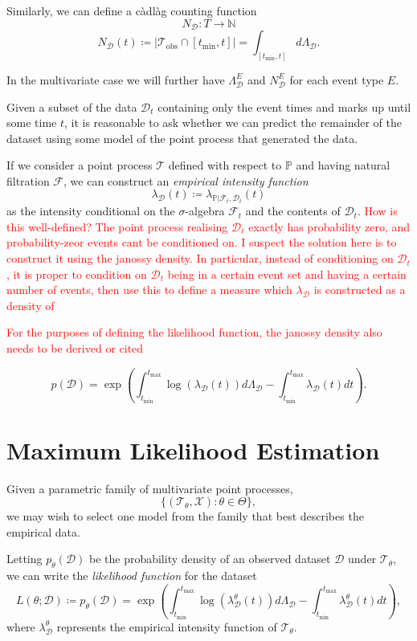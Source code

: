 \documentclass[honours,12pt]{unswthesis}
\numberwithin{equation}{section}
\begin{document}
Similarly, we can define a càdlàg counting function
$$N_\mathcal{D} : T \to \mathbb{N}$$
$$N_\mathcal{D}(t) \coloneq \left\vert \mathcal{T}_\mathrm{obs}\cap [t_\mathrm{min},t]\right\vert = \int_{[t_\mathrm{min},t]} d\Lambda_\mathcal{D}.$$

In the multivariate case we will further have $\Lambda_\mathcal{D}^E$ and $N_\mathcal{D}^E$ for each event type $E$.

Given a subset of the data $\mathcal{D}_t$ containing only the event times and marks up until some time $t$, it is reasonable to ask whether we can predict the remainder of the dataset using some model of the point process that generated the data.

If we consider a point process $\mathcal{T}$ defined with respect to $\mathbb{P}$ and having natural filtration $\mathcal{F}$, we can construct an \textit{empirical intensity function}
$$\lambda_\mathcal{D}(t) \coloneq \lambda_{\mathbb{P}\vert\mathcal{F}_t,\mathcal{D}_t}(t)$$
as the intensity conditional on the $\sigma$-algebra $\mathcal{F}_t$ and the contents of $\mathcal{D}_t$. \textcolor{red}{How is this well-defined? The point process realising $\mathcal{D}_t$ exactly has probability zero, and probability-zeor events cant be conditioned on. I suspect the solution here is to construct it using the janossy density. In particular, instead of conditioning on $\mathcal{D}_t$, it is proper to condition on $\mathcal{D}_t$ being in a certain event set and having a certain number of events, then use this to define a measure which $\lambda_\mathcal{D}$ is constructed as a density of}

\textcolor{red}{For the purposes of defining the likelihood function, the janossy density also needs to be derived or cited}

$$p(\mathcal{D}) = \exp\left(\int_{t_\mathrm{min}}^{t_\mathrm{max}}\log(\lambda_\mathcal{D}(t))d\Lambda_\mathcal{D}-\int_{t_\mathrm{min}}^{t_\mathrm{max}}\lambda_\mathcal{D}(t) dt\right).$$

\section{Maximum Likelihood Estimation}
Given a parametric family of multivariate point processes,
$$\{(\mathcal{T}_\theta,\mathcal{X}) : \theta\in\Theta\},$$
we may wish to select one model from the family that best describes the empirical data.

Letting $p_\theta(\mathcal{D})$ be the probability density of an observed dataset $\mathcal{D}$ under $\mathcal{T}_\theta$, we can write the \textit{likelihood function} for the dataset
$$L(\theta ; \mathcal{D}) \coloneq p_\theta(\mathcal{D}) = \exp\left(\int_{t_\mathrm{min}}^{t_\mathrm{max}}\log(\lambda_\mathcal{D}^\theta(t))d\Lambda_\mathcal{D}-\int_{t_\mathrm{min}}^{t_\mathrm{max}}\lambda_\mathcal{D}^\theta(t) dt\right),$$
where $\lambda_\mathcal{D}^\theta$ represents the empirical intensity function of $\mathcal{T}_\theta$.
\end{document}
